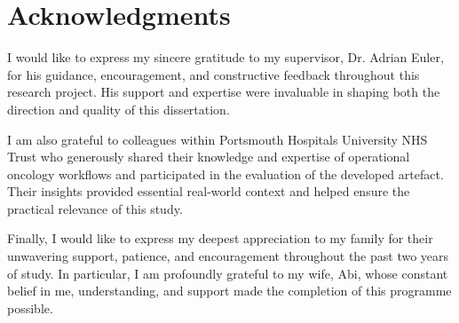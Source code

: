 \chapter*{Acknowledgments}
I would like to express my sincere gratitude to my supervisor, Dr. Adrian Euler, for his guidance, encouragement, and constructive feedback throughout this research project. His support and expertise were invaluable in shaping both the direction and quality of this dissertation. 

I am also grateful to colleagues within Portsmouth Hospitals University NHS Trust who generously shared their knowledge and expertise of operational oncology workflows and participated in the evaluation of the developed artefact. Their insights provided essential real-world context and helped ensure the practical relevance of this study. 

Finally, I would like to express my deepest appreciation to my family for their unwavering support, patience, and encouragement throughout the past two years of study. In particular, I am profoundly grateful to my wife, Abi, whose constant belief in me, understanding, and support made the completion of this programme possible. 
